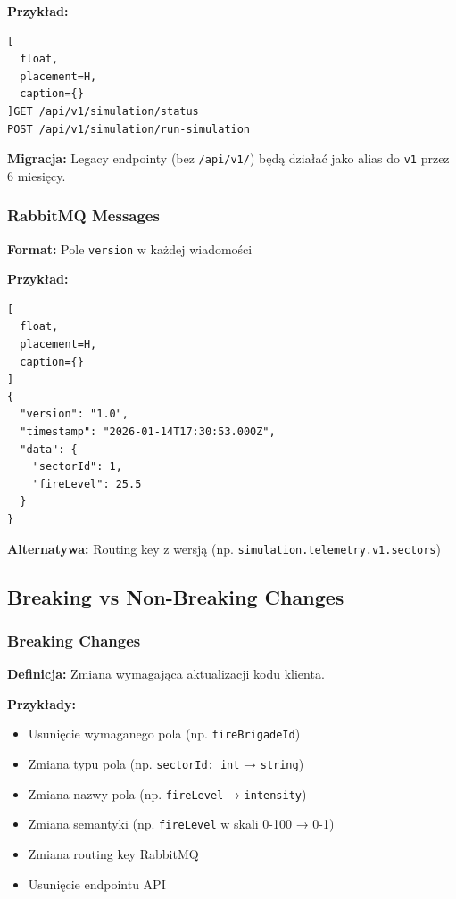 \documentclass[11pt,a4paper] {article}
\begin{document}
\textbf{Przykład:}
\begin{lstlisting}[
  float,
  placement=H,
  caption={}
]GET /api/v1/simulation/status
POST /api/v1/simulation/run-simulation
\end{lstlisting}

\textbf{Migracja:} Legacy endpointy (bez \texttt{/api/v1/}) będą działać jako alias do \texttt{v1} przez 6 miesięcy.

\subsubsection{RabbitMQ Messages}

\textbf{Format:} Pole \texttt{version} w każdej wiadomości

\textbf{Przykład:}
\begin{lstlisting}[
  float,
  placement=H,
  caption={}
] 
{
  "version": "1.0",
  "timestamp": "2026-01-14T17:30:53.000Z",
  "data": {
    "sectorId": 1,
    "fireLevel": 25.5
  }
}
\end{lstlisting}

\textbf{Alternatywa:} Routing key z wersją (np. \texttt{simulation.telemetry.v1.sectors})

\subsection{Breaking vs Non-Breaking Changes}

\subsubsection{Breaking Changes}

\textbf{Definicja:} Zmiana wymagająca aktualizacji kodu klienta.

\textbf{Przykłady:}
\begin{itemize}
    \item Usunięcie wymaganego pola (np. \texttt{fireBrigadeId})
    \item Zmiana typu pola (np. \texttt{sectorId: int} → \texttt{string})
    \item Zmiana nazwy pola (np. \texttt{fireLevel} → \texttt{intensity})
    \item Zmiana semantyki (np. \texttt{fireLevel} w skali 0-100 → 0-1)
    \item Zmiana routing key RabbitMQ
    \item Usunięcie endpointu API
\end{itemize}
\end{document}
